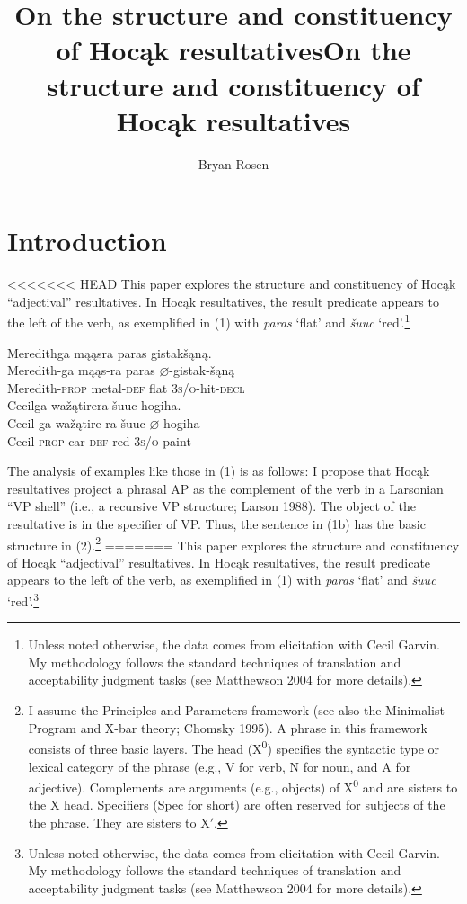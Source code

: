 \documentclass[output=paper]{LSP/langsci}
\author{Bryan Rosen}
\title{On the structure and constituency of Hocąk resultatives}
\title{On the structure and constituency of Hoc\k{a}k resultatives}
\begin{document}
\section{Introduction}

<<<<<<< HEAD
This paper explores the structure and constituency of Hocąk ``adjectival'' resultatives. In Hocąk resultatives, the result predicate appears to the left of the verb, as exemplified in (1) with \textit{paras} `flat' and \textit{šuuc} `red'.\footnote{Unless noted otherwise, the data comes from  elicitation with Cecil Garvin. My methodology follows the standard techniques of translation and acceptability judgment tasks (see Matthewson 2004 for more details).}

\ea
\ea
\glll Meredithga mąąsra paras gistakšąną. \\
 Meredith-ga mąąs-ra paras {$\varnothing$}-gistak-šąną\\
Meredith-\textsc{prop} metal-\textsc{def} flat  \textsc{3s/o}-hit-\textsc{decl}\\

\ex 
\glll Cecilga wažątirera šuuc hogiha. \\
Cecil-ga  wažątire-ra šuuc {$\varnothing$}-hogiha \\
Cecil-\textsc{prop} car-\textsc{def} red \textsc{3s/o}-paint\\
\z
\z


The analysis of examples like those in (1) is as follows: I propose that Hocąk resultatives project a phrasal AP as the complement of the verb in a Larsonian ``VP shell'' (i.e., a recursive VP structure; Larson 1988). The object of the resultative is in the specifier of VP. Thus, the sentence in (1b) has the basic structure in (2).\footnote{I assume the Principles and Parameters framework (see also the Minimalist Program and X-bar theory; Chomsky 1995). A phrase in this framework consists of three basic layers. The head (X\textsuperscript{0}) specifies the syntactic type or lexical category of the phrase (e.g., V for verb, N for noun, and A for adjective). Complements are arguments (e.g., objects) of X\textsuperscript{0} and are sisters to the X head. Specifiers (Spec for short) are often reserved for subjects of the the phrase. They are sisters to X$'$.}
=======
This paper explores the structure and constituency of Hoc\k{a}k ``adjectival'' resultatives. In Hoc\k{a}k resultatives, the result predicate appears to the left of the verb, as exemplified in (1) with \textit{paras} `flat' and \textit{\v{s}uuc} `red'.\footnote{Unless noted otherwise, the data comes from  elicitation with Cecil Garvin. My methodology follows the standard techniques of translation and acceptability judgment tasks (see Matthewson 2004 for more details).}
\end{document}
